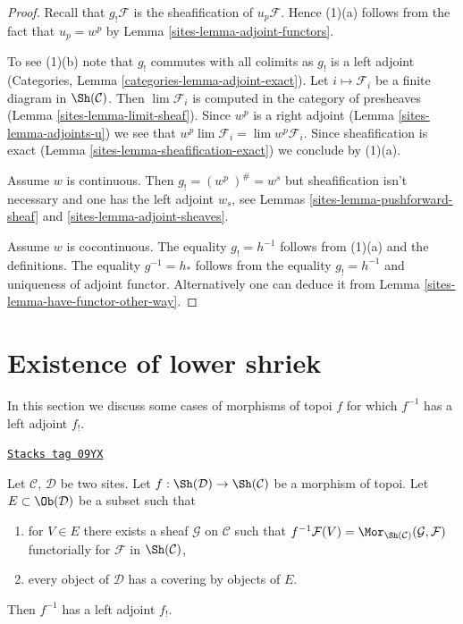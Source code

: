 \begin{proof}

Recall that $g_!\mathcal{F}$ is the sheafification of $u_p\mathcal{F}$.
Hence (1)(a) follows from the fact that $u_p = w^p$ by
Lemma \ref{sites-lemma-adjoint-functors}.

\medskip\noindent
To see (1)(b) note that $g_!$ commutes with all colimits as $g_!$
is a left adjoint (Categories, Lemma \ref{categories-lemma-adjoint-exact}).
Let $i \mapsto \mathcal{F}_i$ be a finite diagram in $\Sh(\mathcal{C})$.
Then $\lim \mathcal{F}_i$ is computed in the category of presheaves
(Lemma \ref{sites-lemma-limit-sheaf}). Since $w^p$ is a right adjoint
(Lemma \ref{sites-lemma-adjoints-u})
we see that $w^p \lim \mathcal{F}_i = \lim w^p\mathcal{F}_i$. Since
sheafification is exact
(Lemma \ref{sites-lemma-sheafification-exact})
we conclude by (1)(a).

\medskip\noindent
Assume $w$ is continuous. Then $g_! = (w^p\ )^\# = w^s$ but sheafification
isn't necessary and one has the left adjoint $w_s$, see
Lemmas \ref{sites-lemma-pushforward-sheaf} and \ref{sites-lemma-adjoint-sheaves}.

\medskip\noindent
Assume $w$ is cocontinuous. The equality $g_! = h^{-1}$ follows from (1)(a)
and the definitions. The equality $g^{-1} = h_*$ follows from the equality
$g_! = h^{-1}$ and uniqueness of adjoint functor. Alternatively one can deduce
it from Lemma \ref{sites-lemma-have-functor-other-way}.
\end{proof}

\section{Existence of lower shriek}
\label{sites-section-lower-shriek}
In this section we discuss some cases of morphisms of topoi $f$ for which
$f^{-1}$ has a left adjoint $f_!$.

\begin{lemma}
\label{sites-lemma-existence-lower-shriek}
\href{https://stacks.math.columbia.edu/tag/09YX}{\texttt{Stacks tag 09YX}}

Let $\mathcal{C}$, $\mathcal{D}$ be two sites.
Let $f : \Sh(\mathcal{D}) \to \Sh(\mathcal{C})$ be a morphism of topoi.
Let $E \subset \Ob(\mathcal{D})$ be a subset such that
\begin{enumerate}
\item for $V \in E$ there exists a sheaf $\mathcal{G}$
on $\mathcal{C}$ such that $f^{-1}\mathcal{F}(V) =
\Mor_{\Sh(\mathcal{C})}(\mathcal{G}, \mathcal{F})$ functorially
for $\mathcal{F}$ in $\Sh(\mathcal{C})$,
\item every object of $\mathcal{D}$ has a covering by objects of $E$.
\end{enumerate}
Then $f^{-1}$ has a left adjoint $f_!$.
\end{lemma}

